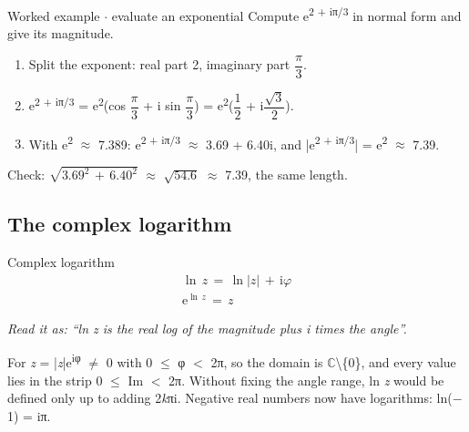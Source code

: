 \documentclass[11pt]{article}
\begin{document}
\begin{keepsection}
\begin{keepsection}
\begin{workedbox}{Worked example \ensuremath{\cdot} evaluate an exponential}
Compute e\textsuperscript{2 + iπ/3} in normal form and give its magnitude.

\begin{enumerate}
\item Split the exponent: real part 2, imaginary part {\small\ensuremath{\dfrac{π}{3}}}.
\item e\textsuperscript{2 + iπ/3} = e\textsuperscript{2}(cos {\small\ensuremath{\dfrac{π}{3}}} + i sin {\small\ensuremath{\dfrac{π}{3}}}) = e\textsuperscript{2}({\small\ensuremath{\dfrac{1}{2}}} + i{\small\ensuremath{\dfrac{\sqrt{3}}{2}}}).
\item With e\textsuperscript{2} \ensuremath{\approx} 7.389: e\textsuperscript{2 + iπ/3} \ensuremath{\approx} 3.69 + 6.40i, and |e\textsuperscript{2 + iπ/3}| = e\textsuperscript{2} \ensuremath{\approx} 7.39.
\end{enumerate}

Check: \ensuremath{\sqrt{3.69^{2}\, +\, 6.40^{2}}} \ensuremath{\approx} \ensuremath{\sqrt{54.6}} \ensuremath{\approx} 7.39, the same length.
\end{workedbox}
\end{keepsection}

\begin{keepsection}
\subsection{The complex logarithm}

\begin{equationcard}{Complex logarithm}
\[ \begin{gathered} \ln \, {z}\, =\, \ln |{z}|\, +\, \mathrm{i}φ \\ \mathrm{e}^{\ln \, {z}}\, =\, {z} \end{gathered} \]
{\small \emph{Read it as: “ln z is the real log of the magnitude plus i times the angle”.}\par For \textit{z} = |\textit{z}|e\textsuperscript{iφ} \ensuremath{\neq} 0 with 0 \ensuremath{\leq} φ \ensuremath{<} 2π, so the domain is \ensuremath{\mathbb{C}}\textbackslash{}\{0\}, and every value lies in the strip 0 \ensuremath{\leq} Im \ensuremath{<} 2π. Without fixing the angle range, ln \textit{z} would be defined only up to adding 2\textit{k}πi. Negative real numbers now have logarithms: ln(\ensuremath{-}1) = iπ.}
\end{equationcard}


\end{keepsection}
\end{keepsection}
\end{document}
